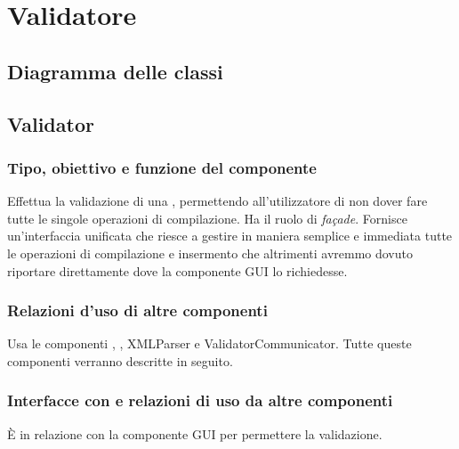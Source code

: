 \documentclass[11pt,titlepage,a4paper]{report}
\begin{document}
\section{Validatore}
\subsection{Diagramma delle classi}
\begin{center}
\end{center}
\subsection{Validator}%
\subsubsection{Tipo, obiettivo e funzione del componente}
Effettua la validazione di una \br, permettendo all'utilizzatore di non dover fare tutte le singole operazioni di compilazione. Ha il ruolo di \textit{fa\c{c}ade}. Fornisce un'interfaccia unificata che riesce a gestire in maniera semplice e immediata tutte le operazioni di compilazione e insermento che altrimenti avremmo dovuto riportare direttamente dove la componente GUI lo richiedesse.
\subsubsection{Relazioni d'uso di altre componenti}
Usa le componenti \brp, \brl, XMLParser e ValidatorCommunicator. Tutte queste componenti verranno descritte in seguito.
\subsubsection{Interfacce con e relazioni di uso da altre componenti}
\`E in relazione con la componente GUI per permettere la validazione.
\end{document}
